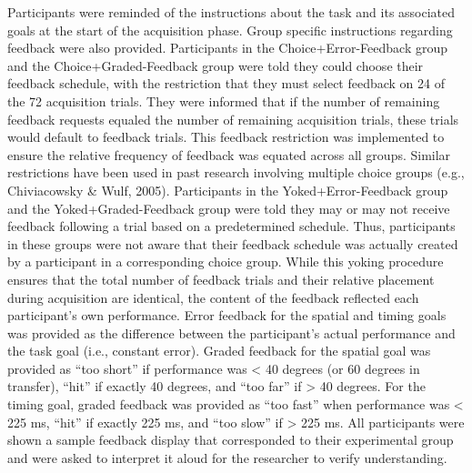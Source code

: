 \documentclass[
  doc, donotrepeattitle,floatsintext]{apa7}
\begin{document}
Participants were reminded of the instructions about the task and its associated goals at the start of the acquisition phase. Group specific instructions regarding feedback were also provided. Participants in the Choice+Error-Feedback group and the Choice+Graded-Feedback group were told they could choose their feedback schedule, with the restriction that they must select feedback on 24 of the 72 acquisition trials. They were informed that if the number of remaining feedback requests equaled the number of remaining acquisition trials, these trials would default to feedback trials. This feedback restriction was implemented to ensure the relative frequency of feedback was equated across all groups. Similar restrictions have been used in past research involving multiple choice groups (e.g., Chiviacowsky \& Wulf, 2005). Participants in the Yoked+Error-Feedback group and the Yoked+Graded-Feedback group were told they may or may not receive feedback following a trial based on a predetermined schedule. Thus, participants in these groups were not aware that their feedback schedule was actually created by a participant in a corresponding choice group. While this yoking procedure ensures that the total number of feedback trials and their relative placement during acquisition are identical, the content of the feedback reflected each participant's own performance. Error feedback for the spatial and timing goals was provided as the difference between the participant's actual performance and the task goal (i.e., constant error). Graded feedback for the spatial goal was provided as ``too short'' if performance was \textless{} 40 degrees (or 60 degrees in transfer), ``hit'' if exactly 40 degrees, and ``too far'' if \textgreater{} 40 degrees. For the timing goal, graded feedback was provided as ``too fast'' when performance was \textless{} 225 ms, ``hit'' if exactly 225 ms, and ``too slow'' if \textgreater{} 225 ms. All participants were shown a sample feedback display that corresponded to their experimental group and were asked to interpret it aloud for the researcher to verify understanding.

\clearpage
\end{document}

